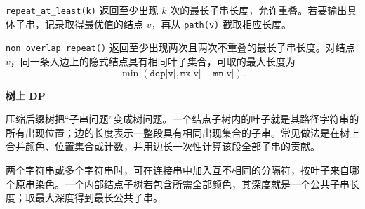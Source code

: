 \texttt{repeat\_at\_least(k)} 返回至少出现 $k$ 次的最长子串长度，允许重叠。若要输出具体子串，记录取得最优值的结点 $v$，再从 \texttt{path(v)} 截取相应长度。

\texttt{non\_overlap\_repeat()} 返回至少出现两次且两次不重叠的最长子串长度。对结点 $v$，同一条入边上的隐式结点具有相同叶子集合，可取的最大长度为
\[
  \min(\texttt{dep[v]},\texttt{mx[v]}-\texttt{mn[v]}).
\]

\textbf{树上 DP}

压缩后缀树把“子串问题”变成树问题。一个结点子树内的叶子就是其路径字符串的所有出现位置；边的长度表示一整段具有相同出现集合的子串。常见做法是在树上合并颜色、位置集合或计数，并用边长一次性计算该段全部子串的贡献。

两个字符串或多个字符串时，可在连接串中加入互不相同的分隔符，按叶子来自哪个原串染色。一个内部结点子树若包含所需全部颜色，其深度就是一个公共子串长度；取最大深度得到最长公共子串。
